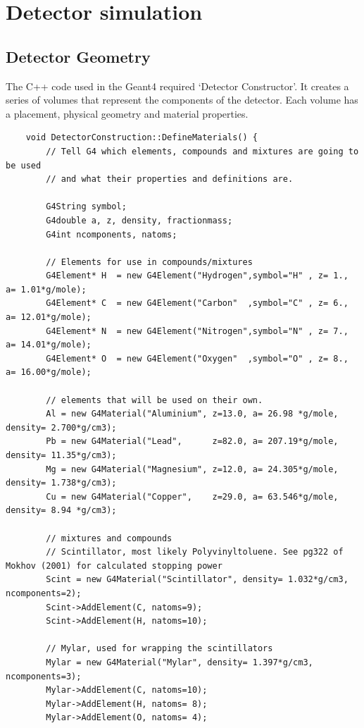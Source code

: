 \documentclass[]{article}
\begin{document}
\section{Detector simulation} %
\label{app:detector_simulation}
\subsection{Detector Geometry} %
\label{appsub:detector_geometry}
The C++ code used in the Geant4 required `Detector Constructor'. It creates a series of volumes that represent the components of the detector. Each volume has a placement, physical geometry and material properties.
 
\begin{verbatim}
    void DetectorConstruction::DefineMaterials() {
        // Tell G4 which elements, compounds and mixtures are going to be used
        // and what their properties and definitions are. 
        
        G4String symbol;        
        G4double a, z, density, fractionmass; 
        G4int ncomponents, natoms;
        
        // Elements for use in compounds/mixtures
        G4Element* H  = new G4Element("Hydrogen",symbol="H" , z= 1., a= 1.01*g/mole);
        G4Element* C  = new G4Element("Carbon"  ,symbol="C" , z= 6., a= 12.01*g/mole);
        G4Element* N  = new G4Element("Nitrogen",symbol="N" , z= 7., a= 14.01*g/mole);
        G4Element* O  = new G4Element("Oxygen"  ,symbol="O" , z= 8., a= 16.00*g/mole);
        
        // elements that will be used on their own.
        Al = new G4Material("Aluminium", z=13.0, a= 26.98 *g/mole, density= 2.700*g/cm3);
        Pb = new G4Material("Lead",      z=82.0, a= 207.19*g/mole, density= 11.35*g/cm3);
        Mg = new G4Material("Magnesium", z=12.0, a= 24.305*g/mole, density= 1.738*g/cm3);
        Cu = new G4Material("Copper",    z=29.0, a= 63.546*g/mole, density= 8.94 *g/cm3);
    
        // mixtures and compounds
        // Scintillator, most likely Polyvinyltoluene. See pg322 of Mokhov (2001) for calculated stopping power
        Scint = new G4Material("Scintillator", density= 1.032*g/cm3, ncomponents=2);
        Scint->AddElement(C, natoms=9);
        Scint->AddElement(H, natoms=10);
        
        // Mylar, used for wrapping the scintillators
        Mylar = new G4Material("Mylar", density= 1.397*g/cm3, ncomponents=3);
        Mylar->AddElement(C, natoms=10);
        Mylar->AddElement(H, natoms= 8);
        Mylar->AddElement(O, natoms= 4);
    

\end{verbatim}
\end{document}

